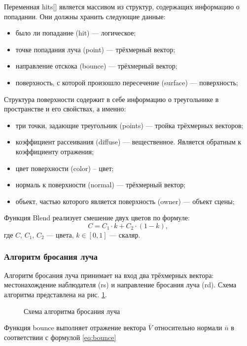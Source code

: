 Переменная hits[] является массивом из структур, содержащих информацию о попадании. Они должны хранить следующие данные:
\begin{itemize}
	\item было ли попадание (hit) --- логическое;
	\item точке попадания луча (point) --- трёхмерный вектор;
	\item направление отскока (bounce) --- трёхмерный вектор;
	\item поверхность, с которой произошло пересечение (surface) --- поверхность;
\end{itemize}

Структура поверхности содержит в себе информацию о треугольнике в пространстве и его свойствах, а именно:
\begin{itemize}
	\item три точки, задающие треугольник (points) --- тройка трёхмерных векторов;
	\item коэффициент рассеивания (diffuse) --- вещественное. Является обратным к коэффициенту отражения;
	\item цвет поверхности (color) – цвет;
	\item нормаль к поверхности (normal) --- трёхмерный вектор;
	\item объект, частью которого является поверхность (owner) --- объект сцены;
\end{itemize}

Функция Blend реализует смешение двух цветов по формуле:
\begin{equation}
	\label{eq:color_blend}
	C = C_1\cdot k+C_2\cdot(1-k),
\end{equation}
где $C$, $C_1$, $C_2$ --- цвета, $k\in[0, 1]$ --- скаляр.

\subsubsection{Алгоритм бросания луча}
Алгоритм бросания луча принимает на вход два трёхмерных вектора: местонахождение наблюдателя (rs) и направление бросания луча (rd). Схема алгоритма представлена на рис. \ref{fig:throw_ray}.

\begin{figure}[!ht]
	\caption{Схема алгоритма бросания луча}
	\label{fig:throw_ray}
\end{figure}

Функция bounce выполняет отражение вектора $\bar V$ относительно нормали $\bar n$ в соответствии с формулой \ref{eq:bounce}

